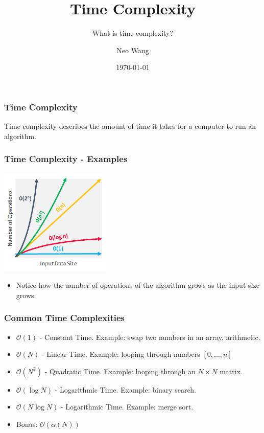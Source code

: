 \documentclass{beamer}
\title{Time Complexity}
\author{Neo Wang}
\institute{Westlake High School}
\date{\today}
\begin{document}
\frame{\titlepage}



\begin{frame}
\frametitle{Time Complexity}
\subtitle{What is time complexity?}

Time complexity describes the amount of time it takes for a computer to run
an algorithm.

\end{frame}

\begin{frame}
	\frametitle{Time Complexity - Examples}
	\includegraphics[width=200px]{2021-08-31-13-46-02.png}
	\begin{itemize}
		\item Notice how the number of operations of the algorithm grows as the input size grows.
	\end{itemize}
\end{frame}

\begin{frame}{}
	\frametitle{Common Time Complexities}
	\begin{itemize}
		\item $\mathcal{O}(1)$ - Constant Time. Example: swap two numbers in an array, arithmetic.
		\item $\mathcal{O}(N)$ - Linear Time. Example: looping through
		numbers $[0, \ldots ,n]$
		\item $\mathcal{O}(N^2)$ - Quadratic Time. Example: looping through an
		$N \times N$ matrix.
		\item $\mathcal{O}(\log N)$ - Logarithmic Time. Example: binary search.
		\item $\mathcal{O}(N\log N)$ - Logarithmic Time. Example: merge sort.
		\item Bonus: $\mathcal{O}(\alpha (N))$
	\end{itemize}
\end{frame}
\end{document}
